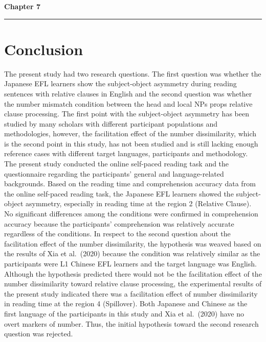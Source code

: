 \documentclass[
]{article}
\begin{document}
\newpage

\clearpage
\thispagestyle{empty}  %
\vspace*{-1cm}
\begin{flushleft}
\Huge \textbf{Chapter 7}
\end{flushleft}
\vspace{0.3cm}
\noindent\rule{\linewidth}{0.6pt}
\pagestyle{fancy}  %

\section{Conclusion}\label{conclusion}

The present study had two research questions. The first question was
whether the Japanese EFL learners show the subject-object asymmetry
during reading sentences with relative clauses in English and the second
question was whether the number mismatch condition between the head and
local NPs props relative clause processing. The first point with the
subject-object asymmetry has been studied by many scholars with
different participant populations and methodologies, however, the
facilitation effect of the number dissimilarity, which is the second
point in this study, has not been studied and is still lacking enough
reference cases with different target languages, participants and
methodology. The present study conducted the online self-paced reading
task and the questionnaire regarding the participants' general and
language-related backgrounds. Based on the reading time and
comprehension accuracy data from the online self-paced reading task, the
Japanese EFL learners showed the subject-object asymmetry, especially in
reading time at the region 2 (Relative Clause). No significant
differences among the conditions were confirmed in comprehension
accuracy because the participants' comprehension was relatively accurate
regardless of the conditions. In respect to the second question about
the facilitation effect of the number dissimilarity, the hypothesis was
weaved based on the results of Xia et al.~(2020) because the condition
was relatively similar as the participants were L1 Chinese EFL learners
and the target language was English. Although the hypothesis predicted
there would not be the facilitation effect of the number dissimilarity
toward relative clause processing, the experimental results of the
present study indicated there was a facilitation effect of number
dissimilarity in reading time at the region 4 (Spillover). Both Japanese
and Chinese as the first language of the participants in this study and
Xia et al.~(2020) have no overt markers of number. Thus, the initial
hypothesis toward the second research question was rejected.
\end{document}
